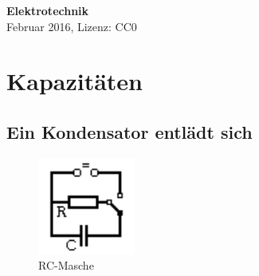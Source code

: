 \documentclass[a4paper,10pt,fleqn,twocolumn,twoside]{article}
\numberwithin{equation}{section}
\begin{document}

\noindent
\textbf{\huge Elektrotechnik}\\
Februar 2016, Lizenz: CC0

\tableofcontents

\section{Kapazitäten}
\subsection{Ein Kondensator entlädt sich}

\begin{figure}[h]
\centering
\includegraphics[width=32mm]{img/RC.png}
\caption{RC-Masche}
\label{RC}
\end{figure}
\end{document}
